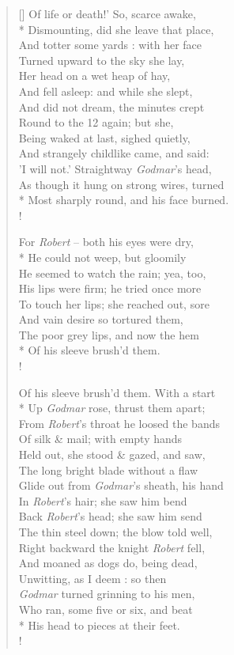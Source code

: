 \documentclass[MAIN]{subfiles}
\begin{document}
\begin{verse}[\versewidth]
{\color{white} Of life or death!'} So, scarce awake,\\*
Dismounting, did she leave that place,\\
And totter some yards : with her face\\
Turned upward to the sky she lay,\\
Her head on a wet heap of hay,\\
And fell asleep: and while she slept,\\
And did not dream, the minutes crept\\
Round to the 12 again; but she,\\
Being waked at last, sighed quietly,\\
And strangely childlike came, and said:\\
'I will not.' Straightway \emph{Godmar}'s head,\\
As though it hung on strong wires, turned\\*
Most sharply round, and his face burned.\\!

For \emph{Robert} -- both his eyes were dry,\\*
He could not weep, but gloomily\\
He seemed to watch the rain; yea, too,\\
His lips were firm; he tried once more\\
To touch her lips; she reached out, sore\\
And vain desire so tortured them,\\
The poor grey lips, and now the hem\\*
Of his sleeve brush'd them.\\!

{\color{white} Of his sleeve brush'd them.} With a start\\*
Up \emph{Godmar} rose, thrust them apart;\\
From \emph{Robert}'s throat he loosed the bands\\
Of silk \& mail; with empty hands\\
Held out, she stood \& gazed, and saw,\\
The long bright blade without a flaw\\
Glide out from \emph{Godmar}'s sheath, his hand\\
In \emph{Robert}'s hair; she saw him bend\\
Back \emph{Robert}'s head; she saw him send\\
The thin steel down; the blow told well,\\
Right backward the knight \emph{Robert} fell,\\
And moaned as dogs do, being  dead,\\
Unwitting, as I deem : so then\\
\emph{Godmar} turned grinning to his men,\\
Who ran, some five or six, and beat\\*
His head to pieces at their feet.\\!


\end{verse}
\end{document}
